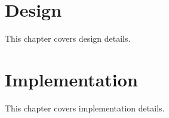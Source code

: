 	\chapter{Design}
	This chapter covers design details. 
	
	
	\chapter{Implementation}
	This chapter covers implementation details.
	
	
	
	
	
	\afterpage{\thispagestyle{empty}}

	
	
	\label{lastpagewithoutappendix}

	\appendix
	
	\cleardoublepage

